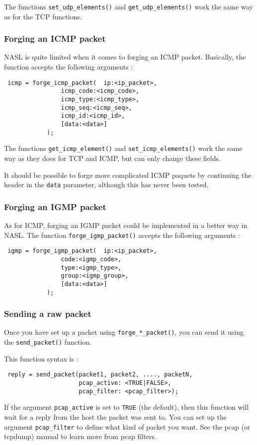 \documentclass{article}
\begin{document}
The functions \verb+set_udp_elements()+ and \verb+get_udp_elements()+ work
the same way as for the TCP functions.

\subsubsection{Forging an ICMP packet}
NASL is quite limited when it comes to forging an ICMP packet. Basically,
the function accepts the following arguments :
\begin{verbatim}
 icmp = forge_icmp_packet(	ip:<ip_packet>,
				icmp_code:<icmp_code>,
				icmp_type:<icmp_type>,
				icmp_seq:<icmp_seq>,
				icmp_id:<icmp_id>,
				[data:<data>]
			);
\end{verbatim}

The functions \verb+get_icmp_element()+ and \verb+set_icmp_elements()+ work the same way as they does for TCP and ICMP, but can only change these fields.

It should be possible to forge more complicated ICMP paquets by continuing
the header in the \verb+data+ parameter, although this has never been tested.

\subsubsection{Forging an IGMP packet}
As for ICMP, forging an IGMP packet could be implemented in a better way in NASL. The function \verb+forge_igmp_packet()+ accepts the following arguments :
\begin{verbatim}
 igmp = forge_igmp_packet(	ip:<ip_packet>,
				code:<igmp_code>,
				type:<igmp_type>,
				group:<igmp_group>,
				[data:<data>]
			);
\end{verbatim}
 
\subsubsection{Sending a raw packet}

Once you have set up a packet using \verb+forge_*_packet()+, you
can send it using the \verb+send_packet()+ function.

This function syntax is :
\begin{verbatim}
 reply = send_packet(packet1, packet2, ...., packetN,
                     pcap_active: <TRUE|FALSE>,
                     pcap_filter: <pcap_filter>);
\end{verbatim}

If the argument \verb+pcap_active+ is set to \verb+TRUE+ (the default),
then this function will wait for a reply from the host the packet was
sent to. You can set up the argument \verb+pcap_filter+ to define
what kind of packet you want. See the pcap (or tcpdump) manual to learn more from
pcap filters.		  
\end{document}
